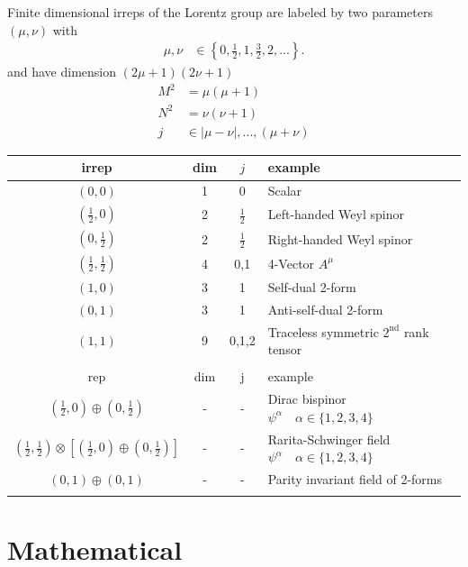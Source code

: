\documentclass[10pt,a4paper]{book}
\theoremstyle{definition}
\begin{document}
Finite dimensional irreps of the Lorentz group are labeled by two parameters $(\mu,\nu)$ with
\begin{align}
    \mu,\nu &\in \left\{0,\frac{1}{2},1,\frac{3}{2},2,...\right\}.
\end{align}
and have dimension $(2\mu+1)(2\nu+1)$
\begin{align*}
    M^2&=\mu(\mu+1)\\
    N^2&=\nu(\nu+1)\\
    j  &\in |\mu-\nu|, ..., (\mu+\nu)
\end{align*}


\begin{center}
 \begin{tabular}{c c c l} 
 \hline
 irrep & dim & $j$ & example \\ [0.5ex] 
 \hline\hline
 $(0,0)$                        & 1 & 0 & Scalar \\  [0.5ex]
 $(\frac{1}{2},0)$              & 2 & $\frac{1}{2}$ & Left-handed Weyl spinor \\  [0.5ex]
 $(0,\frac{1}{2})$              & 2 & $\frac{1}{2}$ & Right-handed Weyl spinor \\  [0.5ex]
 $(\frac{1}{2},\frac{1}{2})$    & 4 & 0,1 & 4-Vector $A^\mu$ \\  [0.5ex]
 $(1,0)$                        & 3 & 1 & Self-dual 2-form \\  [0.5ex]
 $(0,1)$                        & 3 & 1 & Anti-self-dual 2-form \\  [0.5ex]
 $(1,1)$                        & 9 & 0,1,2 & Traceless symmetric $2^\text{nd}$ rank tensor \\ \hline  \\ [0.5ex]
  \hline
 rep & dim & j & example \\ [0.5ex] 
 \hline\hline
 $(\frac{1}{2},0)\oplus(0,\frac{1}{2})$& - & - & Dirac bispinor $\psi^\alpha\quad \alpha\in\{1,2,3,4\}$ \\  [0.5ex]
 $(\frac{1}{2},\frac{1}{2})\otimes\left[(\frac{1}{2},0)\oplus(0,\frac{1}{2})\right]$& - & - & Rarita-Schwinger field $\psi^\alpha\quad \alpha\in\{1,2,3,4\}$ \\  [0.5ex]
  $(0,1)\oplus(0,1)$& - & - & Parity invariant field of 2-forms\\ \hline \\ [0.5ex]
\end{tabular}
\end{center}



\newpage
\chapter{Mathematical}
\end{document}
